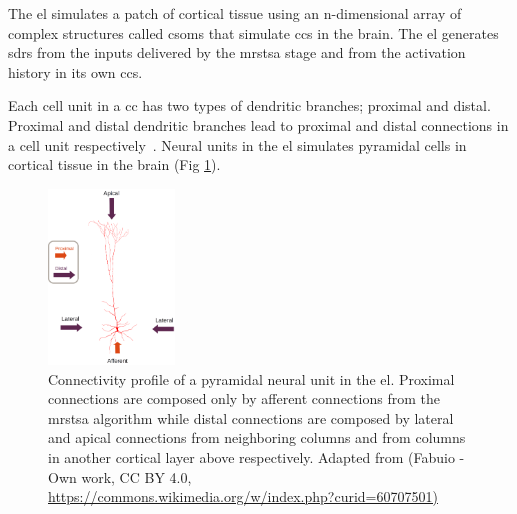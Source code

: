 \documentclass[11pt,a4paper]{article}
\begin{document}


The \gls{el} simulates a patch of cortical tissue using an n-dimensional array of complex structures called \glspl{csom} that simulate \glspl{cc} in the brain. The \gls{el} generates \glspl{sdr} \cite{ahmad_2016} from the inputs delivered by the \gls{mrstsa} stage and from the activation history in its own \glspl{cc}. 

Each cell unit in a \gls{cc} has two types of dendritic branches; proximal and distal. Proximal and distal dendritic branches lead to proximal and distal connections in a cell unit respectively~\cite{Dematties2018}. Neural units in the \gls{el} simulates pyramidal cells in cortical tissue in the brain (Fig \ref{fig:Pyramidal_Cell}). 

\begin{figure}[h!]
    \centering
    \includegraphics[width=0.3\textwidth]{Pyramidal_Cell.png}
    \caption{Connectivity profile of a pyramidal neural unit in the \gls{el}. Proximal connections are composed only by afferent connections from the \gls{mrstsa} algorithm while distal connections are composed by lateral and apical connections from neighboring columns and    from columns in another cortical layer above respectively. Adapted from (Fabuio - Own work, CC BY 4.0, \url{https://commons.wikimedia.org/w/index.php?curid=60707501)}}
    \label{fig:Pyramidal_Cell}
\end{figure}
\end{document}
